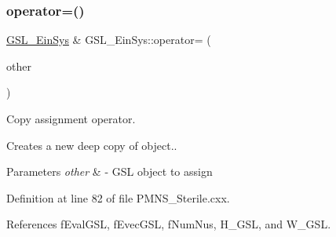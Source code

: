 \subsubsection{\texorpdfstring{operator=()}{operator=()}}
{\footnotesize\ttfamily \hyperlink{structOscProb_1_1GSL__EinSys}{G\+S\+L\+\_\+\+Ein\+Sys} \& G\+S\+L\+\_\+\+Ein\+Sys\+::operator= (\begin{DoxyParamCaption}\item[{const \hyperlink{structOscProb_1_1GSL__EinSys}{G\+S\+L\+\_\+\+Ein\+Sys} \&}]{other }\end{DoxyParamCaption})}

Copy assignment operator.

Creates a new deep copy of object..


\begin{DoxyParams}{Parameters}
{\em other} & -\/ G\+SL object to assign \\
\hline
\end{DoxyParams}


Definition at line 82 of file P\+M\+N\+S\+\_\+\+Sterile.\+cxx.



References f\+Eval\+G\+SL, f\+Evec\+G\+SL, f\+Num\+Nus, H\+\_\+\+G\+SL, and W\+\_\+\+G\+SL.



